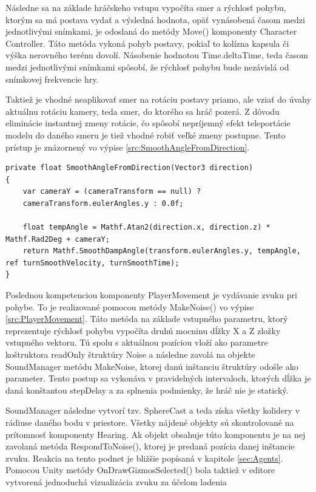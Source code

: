 \documentclass[slovak, master]{diploma}
\begin{document}
Následne sa na základe hráčskeho vstupu vypočíta smer a rýchlosť pohybu, ktorým sa má postava vydať a výsledná hodnota, opäť vynásobená časom medzi jednotlivými snímkami, je odoslaná do metódy Move() komponenty Character Controller. Táto metóda vykoná pohyb postavy, pokiaľ to kolízna kapsula či výška nerovného terénu dovolí. Násobenie hodnotou Time.deltaTime, teda časom medzi jednotlivými snímkami spôsobí, že rýchlosť pohybu bude nezávislá od snímkovej frekvencie hry.

Taktiež je vhodné neaplikovať smer na rotáciu postavy priamo, ale vziať do úvahy aktuálnu rotáciu kamery, teda smer, do ktorého sa hráč pozerá. Z dôvodu eliminácie instantnej zmeny rotácie, čo spôsobí nepríjemný efekt teleportácie modelu do daného smeru je tiež vhodné robiť veľké zmeny postupne. Tento prístup je znázornený vo výpise \ref{src:SmoothAngleFromDirection}.

\vspace{8pt}
\begin{lstlisting}[label=src:SmoothAngleFromDirection,caption={Postupná zmena rotácie postavy v súlade s rotáciu kamery}]
private float SmoothAngleFromDirection(Vector3 direction)
{
    var cameraY = (cameraTransform == null) ? 
    cameraTransform.eulerAngles.y : 0.0f;

    float tempAngle = Mathf.Atan2(direction.x, direction.z) * Mathf.Rad2Deg + cameraY;
    return Mathf.SmoothDampAngle(transform.eulerAngles.y, tempAngle, ref turnSmoothVelocity, turnSmoothTime);
}
\end{lstlisting}

Poslednou kompetenciou komponenty PlayerMovement je vydávanie zvuku pri pohybe. To je realizované pomocou metódy MakeNoise() vo výpise \ref{src:PlayerMovement}. Táto metóda na základe vstupného parametru, ktorý reprezentuje rýchlosť pohybu vypočíta druhú mocninu dĺžky X a Z zložky vstupného vektoru. Tú spolu s aktuálnou pozíciou vloží ako parametre koštruktora readOnly štruktúry Noise a následne zavolá na objekte SoundManager metódu MakeNoise, ktorej danú inštanciu štruktúry odošle ako parameter. Tento postup sa vykonáva v pravidelných intervaloch, ktorých dĺžka je daná konštantou stepDelay a za splnenia podmienky, že hráč nie je statický. 

SoundManager následne vytvorí tzv. SphereCast a teda získa všetky kolidery v rádiuse daného bodu v priestore. Všetky nájdené objekty sú skontrolované na prítomnosť komponenty Hearing. Ak objekt obsahuje túto komponentu je na nej zavolaná metóda RespondToNoise(), ktorej je predaná pozícia danej inštancie zvuku. Reakcia na tento podnet je bližšie popísaná v kapitole \ref{sec:Agents}. Pomocou Unity metódy OnDrawGizmosSelected() bola taktiež v editore vytvorená jednoduchá vizualizácia zvuku za účelom ladenia
\end{document}
